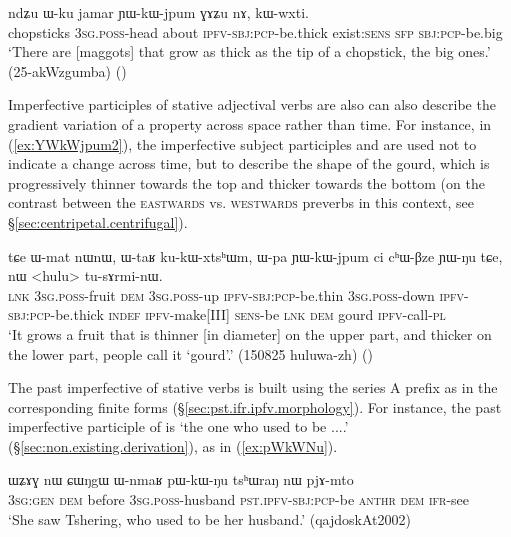 \begin{exe}
\ex \label{ex:YWkWjpum}
 \gll ndʑu ɯ-ku jamar ɲɯ-kɯ-jpum ɣɤʑu nɤ, kɯ-wxti.  \\
 chopsticks \textsc{3sg}.\textsc{poss}-head about \textsc{ipfv}-\textsc{sbj}:\textsc{pcp}-be.thick exist:\textsc{sens} \textsc{sfp} \textsc{sbj}:\textsc{pcp}-be.big \\
 \glt  `There are [maggots] that grow as thick as the tip of a chopstick, the big ones.' (25-akWzgumba)
()
\end{exe}

Imperfective participles of stative adjectival verbs are also can also describe the gradient variation of a property across space rather than time. For instance, in (\ref{ex:YWkWjpum2}), the imperfective subject participles  and  are used not to indicate a change across time, but to describe the shape of the gourd, which is progressively thinner towards the top and thicker towards the bottom (on the contrast between the \textsc{eastwards}  vs. \textsc{westwards}  preverbs in this context, see §\ref{sec:centripetal.centrifugal}).

\begin{exe}
\ex \label{ex:YWkWjpum2}
 \gll  tɕe ɯ-mat nɯnɯ, ɯ-taʁ ku-kɯ-xtsʰɯm, ɯ-pa ɲɯ-kɯ-jpum ci cʰɯ-βze ɲɯ-ŋu tɕe, nɯ <hulu> tu-sɤrmi-nɯ. \\
 \textsc{lnk} \textsc{3sg}.\textsc{poss}-fruit \textsc{dem} \textsc{3sg}.\textsc{poss}-up \textsc{ipfv}-\textsc{sbj}:\textsc{pcp}-be.thin \textsc{3sg}.\textsc{poss}-down \textsc{ipfv}-\textsc{sbj}:\textsc{pcp}-be.thick \textsc{indef} \textsc{ipfv}-make[III]  \textsc{sens}-be \textsc{lnk} \textsc{dem} gourd \textsc{ipfv}-call-\textsc{pl} \\
 \glt `It grows a fruit that is thinner [in diameter] on the upper part, and thicker on the lower part, people call it `gourd'.' (150825 huluwa-zh)
()
\end{exe}

The past imperfective of stative verbs is built using the series A prefix  as in the corresponding finite forms (§\ref{sec:pst.ifr.ipfv.morphology}). For instance, the past imperfective participle of  is  `the one who used to be ....' (§\ref{sec:non.existing.derivation}), as in (\ref{ex:pWkWNu}).

\begin{exe}
\ex \label{ex:pWkWNu}
 \gll  ɯʑɤɣ nɯ ɕɯŋgɯ ɯ-nmaʁ pɯ-kɯ-ŋu tsʰɯraŋ nɯ pjɤ-mto \\
 \textsc{3sg}:\textsc{gen} \textsc{dem} before \textsc{3sg}.\textsc{poss}-husband \textsc{pst}.\textsc{ipfv}-\textsc{sbj}:\textsc{pcp}-be  \textsc{anthr} \textsc{dem} \textsc{ifr}-see \\
\glt `She saw Tshering, who used to be her husband.' (qajdoskAt2002)
\end{exe}

